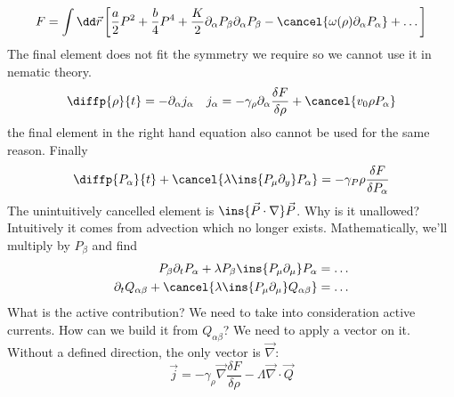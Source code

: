 \begin{equation}
    F = \int \dd \vec{r}\left[\frac{a}{2}P^2+\frac{b}{4}P^4+\frac{K}{2}\partial_\alpha P_\beta\partial_\alpha P_\beta-\cancel{\omega(\rho)\partial_\alpha P_\alpha} + \dots\right]
\end{equation}
The final element does not fit the symmetry we require so we cannot use it in nematic theory.
\begin{align}
    \diffp{\rho}{t} = -\partial_\alpha j_\alpha && j_\alpha = -\gamma_\rho\partial_\alpha\frac{\delta F}{\delta\rho} + \cancel{v_0\rho P_\alpha}
\end{align}
the final element in the right hand equation also cannot be used for the same reason. Finally
\begin{equation}
    \diffp{P_\alpha}{t} + \cancel{\lambda \ins{P_\mu\partial_y}P_\alpha} = -\gamma_P\rho \frac{\delta F}{\delta P_\alpha}
\end{equation}
The unintuitively cancelled element is \(\ins{\vec{P}\cdot\nabla}\vec{P}\). Why is it unallowed? Intuitively it comes from advection which no longer exists. Mathematically, we'll multiply by \(P_\beta\) and find
\begin{align}
    P_\beta\partial_t P_\alpha + \lambda P_\beta\ins{P_\mu \partial_\mu}P_\alpha = \dots \\
    \partial_t Q_{\alpha\beta} + \cancel{\lambda\ins{P_\mu\partial_\mu}Q_{\alpha\beta}} = \dots
\end{align}
What is the active contribution? We need to take into consideration active currents. How can we build it from \(Q_{\alpha\beta}\)? We need to apply a vector on it. Without a defined direction, the only vector is \(\vec{\nabla}\):
\begin{equation}
    \vec{j} = -\gamma_\rho\vec{\nabla}\frac{\delta F}{\delta\rho}-\Lambda\vec{\nabla}\cdot\vec{Q}
\end{equation}